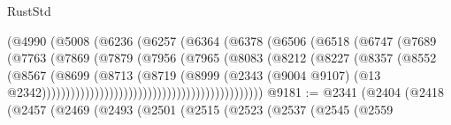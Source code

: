 \begin{lexlean}{RustStd}
\begin{coremodule}
{\begin{coremodule}
{{{{{{{{{{{{{{{{{{{{{{{{{{{{{{{{{{{{{{{{{{{{{{{{{{{{{{{                                          (@4990
                                            (@5008
                                              (@6236
                                                (@6257
                                                  (@6364
                                                    (@6378
                                                      (@6506
                                                        (@6518
                                                          (@6747
                                                            (@7689
                                                              (@7763
                                                                (@7869
                                                                  (@7879
                                                                    (@7956
                                                                      (@7965
                                                                        (@8083
                                                                          (@8212
                                                                            (@8227
                                                                              (@8357
                                                                                (@8552
                                                                                  (@8567
                                                                                    (@8699
                                                                                      (@8713
                                                                                        (@8719
                                                                                          (@8999
                                                                                            (@2343
                                                                                              (@9004
                                                                                                @9107)
                                                                                              (@13
                                                                                                @2342))))))))))))))))))))))))))))))))))))))))))))))
@9181 := @2341
    (@2404
      (@2418
        (@2457
          (@2469
            (@2493
              (@2501
                (@2515
                  (@2523
                    (@2537
                      (@2545
                        (@2559
}}}}}}}}}}}}}}}}}}}}}}}}}}}}}}}}}}}}}}}}}}}}}}}}}}}}}}}
\end{coremodule}}
\end{coremodule}
\end{lexlean}

